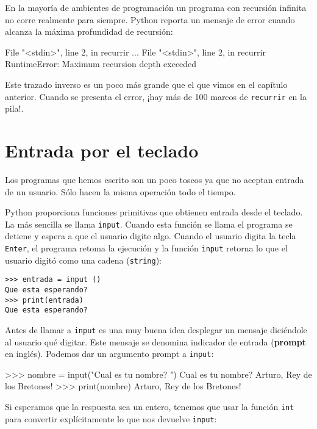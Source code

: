 En la mayoría de ambientes de programación un programa con recursión 
infinita no corre realmente para siempre. Python reporta un mensaje de error
cuando alcanza la máxima profundidad de recursión:

\beforeverb
\begin{pyconcode}
  File "<stdin>", line 2, in recurrir
  ...
  File "<stdin>", line 2, in recurrir
RuntimeError: Maximum recursion depth exceeded
\end{pyconcode}
\afterverb
%

Este trazado inverso es un poco más grande que el que vimos en el 
capítulo anterior. Cuando se presenta el error, ¡hay más de
100 marcos de \texttt{recurrir} en la pila!.

\section{Entrada por el teclado}

Los programas que hemos escrito son un poco toscos ya que no aceptan 
entrada de un usuario. Sólo hacen la misma operación todo el tiempo.

Python proporciona funciones primitivas que obtienen entrada desde el 
teclado. La más sencilla se llama \texttt{input}. Cuando esta función
se llama el programa se detiene y espera a que el usuario digite algo.
Cuando el usuario digita la tecla \texttt{Enter}, el programa retoma
la ejecución y la función \texttt{input} retorna lo que el usuario digitó
como una cadena (\texttt{string}):

\beforeverb
\begin{verbatim}
>>> entrada = input ()
Que esta esperando?
>>> print(entrada)
Que esta esperando?
\end{verbatim}
\afterverb
%

Antes de llamar a  \texttt{input} es una muy buena idea desplegar
un mensaje diciéndole al usuario qué digitar. Este mensaje se denomina
indicador de entrada ({\bf prompt} en inglés).  
Podemos dar un argumento prompt a \texttt{input}:


\beforeverb
\begin{pyconcode}
>>> nombre = input("Cual es tu nombre? ")
Cual es tu nombre? Arturo, Rey de los Bretones!
>>> print(nombre)
Arturo, Rey de los Bretones!
\end{pyconcode}
\afterverb
%

Si esperamos que la respuesta sea un entero, tenemos que usar la función 
\texttt{int} para convertir explícitamente lo que nos devuelve \texttt{input}:

